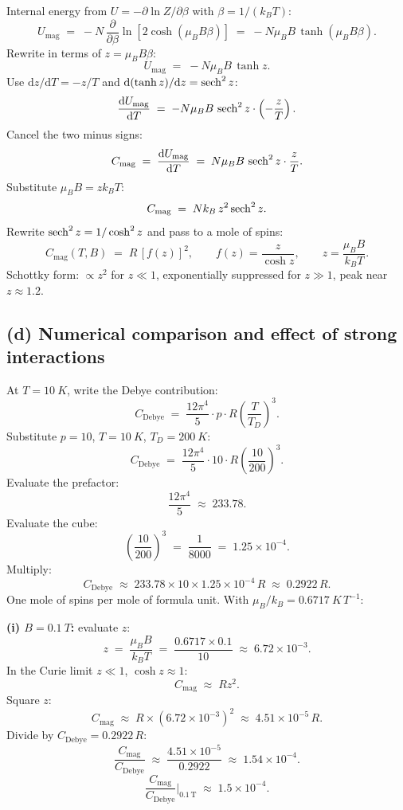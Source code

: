 \documentclass[11pt]{article}
\newcommand{\de}{\mathrm{d}}
\begin{document}
Internal energy from $U = -\partial \ln Z/\partial \beta$ with $\beta = 1/(k_BT)$:
\[
U_{\text{mag}} \;=\; -N\,\frac{\partial}{\partial\beta}\ln[2\cosh(\mu_BB\beta)] \;=\; -N\mu_B B\,\tanh(\mu_B B \beta).
\]
Rewrite in terms of $z = \mu_B B\beta$:
\[
U_{\text{mag}} \;=\; -N\mu_B B\,\tanh z.
\]
Use $\de z/\de T = -z/T$ and $\de(\tanh z)/\de z = \sech^2 z$:
\[
\frac{\de U_{\text{mag}}}{\de T} \;=\; -N\mu_B B\,\sech^2 z\cdot\left(-\frac{z}{T}\right).
\]
Cancel the two minus signs:
\[
C_{\text{mag}} \;=\; \frac{\de U_{\text{mag}}}{\de T} \;=\; N\mu_B B\,\sech^2 z\cdot\frac{z}{T}.
\]
Substitute $\mu_B B = z k_B T$:
\[
C_{\text{mag}} \;=\; N k_B\, z^2 \sech^2 z.
\]
Rewrite $\sech^2 z = 1/\cosh^2 z$ and pass to a mole of spins:
\begin{equation}
\boxed{\;C_{\text{mag}}(T,B) \;=\; R\,[f(z)]^{2}, \qquad f(z) = \frac{z}{\cosh z}, \qquad z = \frac{\mu_B B}{k_B T}.\;}
\label{eq:Cmagbox}
\end{equation}
Schottky form: $\propto z^2$ for $z\ll 1$, exponentially suppressed for $z\gg 1$, peak near $z\approx 1.2$.

\subsection*{(d) Numerical comparison and effect of strong interactions}

At $T=\SI{10}{K}$, write the Debye contribution:
\[
C_{\text{Debye}} \;=\; \frac{12\pi^4}{5}\cdot p\cdot R\!\left(\frac{T}{T_D}\right)^3.
\]
Substitute $p=10$, $T=\SI{10}{K}$, $T_D=\SI{200}{K}$:
\[
C_{\text{Debye}} \;=\; \frac{12\pi^4}{5}\cdot 10\cdot R\!\left(\frac{10}{200}\right)^3.
\]
Evaluate the prefactor:
\[
\frac{12\pi^4}{5} \;\approx\; 233.78.
\]
Evaluate the cube:
\[
\left(\frac{10}{200}\right)^3 \;=\; \frac{1}{8000} \;=\; 1.25\times 10^{-4}.
\]
Multiply:
\[
C_{\text{Debye}} \;\approx\; 233.78\times 10\times 1.25\times 10^{-4}\,R \;\approx\; 0.2922\,R.
\]
One mole of spins per mole of formula unit. With $\mu_B/k_B=\SI{0.6717}{K\,T^{-1}}$:

\textbf{(i) $B=\SI{0.1}{T}$:} evaluate $z$:
\[
z \;=\; \frac{\mu_B B}{k_B T} \;=\; \frac{0.6717\times 0.1}{10} \;\approx\; 6.72\times 10^{-3}.
\]
In the Curie limit $z\ll 1$, $\cosh z\approx 1$:
\[
C_{\text{mag}} \;\approx\; R z^2.
\]
Square $z$:
\[
C_{\text{mag}} \;\approx\; R\times(6.72\times 10^{-3})^2 \;\approx\; 4.51\times 10^{-5}\,R.
\]
Divide by $C_{\text{Debye}}=0.2922\,R$:
\[
\frac{C_{\text{mag}}}{C_{\text{Debye}}} \;\approx\; \frac{4.51\times 10^{-5}}{0.2922} \;\approx\; 1.54\times 10^{-4}.
\]
\begin{equation}
\boxed{\;\frac{C_{\text{mag}}}{C_{\text{Debye}}}\bigg|_{0.1\,\mathrm{T}} \;\approx\; 1.5\times 10^{-4}.\;}
\label{eq:rat1}
\end{equation}
\end{document}
